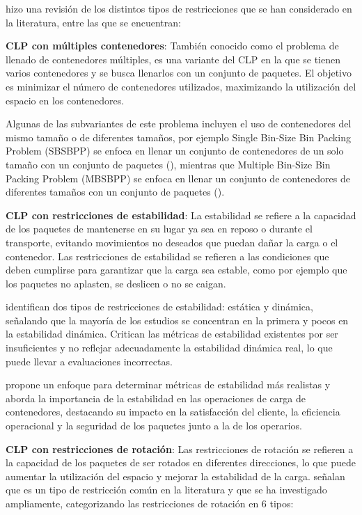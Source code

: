 \documentclass[openany]{article}
\begin{document}
\textcite{Bortfeldt20131} hizo una revisión de los distintos tipos de restricciones que se han considerado en la literatura, entre las que se encuentran:

\textbf{CLP con múltiples contenedores}: También conocido como el problema de llenado de contenedores múltiples, es una variante del CLP en la que se tienen varios contenedores y se busca llenarlos con un conjunto de paquetes. El objetivo es minimizar el número de contenedores utilizados, maximizando la utilización del espacio en los contenedores.

Algunas de las subvariantes de este problema incluyen el uso de contenedores del mismo tamaño o de diferentes tamaños, por ejemplo Single Bin-Size Bin Packing Problem (SBSBPP) se enfoca en llenar un conjunto de contenedores de un solo tamaño con un conjunto de paquetes (\textcite{ren2011priority}), mientras que Multiple Bin-Size Bin Packing Problem (MBSBPP) se enfoca en llenar un conjunto de contenedores de diferentes tamaños con un conjunto de paquetes (\textcite{zhao2016comparative}).

\textbf{CLP con restricciones de estabilidad}: La estabilidad se refiere a la capacidad de los paquetes de mantenerse en su lugar ya sea en reposo o durante el transporte, evitando movimientos no deseados que puedan dañar la carga o el contenedor. Las restricciones de estabilidad se refieren a las condiciones que deben cumplirse para garantizar que la carga sea estable, como por ejemplo que los paquetes no aplasten, se deslicen o no se caigan.

\textcite{Bortfeldt20131} identifican dos tipos de restricciones de estabilidad: estática y dinámica, señalando que la mayoría de los estudios se concentran en la primera y pocos en la estabilidad dinámica. Critican las métricas de estabilidad existentes por ser insuficientes y no reflejar adecuadamente la estabilidad dinámica real, lo que puede llevar a evaluaciones incorrectas.

\textcite{RAMOS2015480} propone un enfoque para determinar métricas de estabilidad más realistas y aborda la importancia de la estabilidad en las operaciones de carga de contenedores, destacando su impacto en la satisfacción del cliente, la eficiencia operacional y la seguridad de los paquetes junto a la de los operarios.


\textbf{CLP con restricciones de rotación}: Las restricciones de rotación se refieren a la capacidad de los paquetes de ser rotados en diferentes direcciones, lo que puede aumentar la utilización del espacio y mejorar la estabilidad de la carga. \textcite{Bortfeldt20131} señalan que es un tipo de restricción común en la literatura y que se ha investigado ampliamente, categorizando las restricciones de rotación en 6 tipos:
\end{document}
